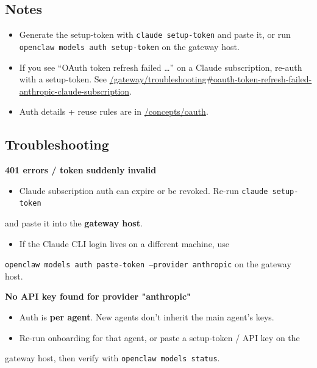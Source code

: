 \subsection{Notes}


\begin{itemize}
  \item Generate the setup-token with \texttt{claude setup-token} and paste it, or run \texttt{openclaw models auth setup-token} on the gateway host.
  \item If you see “OAuth token refresh failed …” on a Claude subscription, re-auth with a setup-token. See \href{/gateway/troubleshooting\#oauth-token-refresh-failed-anthropic-claude-subscription}{/gateway/troubleshooting\#oauth-token-refresh-failed-anthropic-claude-subscription}.
  \item Auth details + reuse rules are in \href{/concepts/oauth}{/concepts/oauth}.
\end{itemize}


\subsection{Troubleshooting}


\textbf{401 errors / token suddenly invalid}

\begin{itemize}
  \item Claude subscription auth can expire or be revoked. Re-run \texttt{claude setup-token}
\end{itemize}

and paste it into the \textbf{gateway host}.
\begin{itemize}
  \item If the Claude CLI login lives on a different machine, use
\end{itemize}

\texttt{openclaw models auth paste-token --provider anthropic} on the gateway host.

\textbf{No API key found for provider "anthropic"}

\begin{itemize}
  \item Auth is \textbf{per agent}. New agents don’t inherit the main agent’s keys.
  \item Re-run onboarding for that agent, or paste a setup-token / API key on the
\end{itemize}

gateway host, then verify with \texttt{openclaw models status}.

